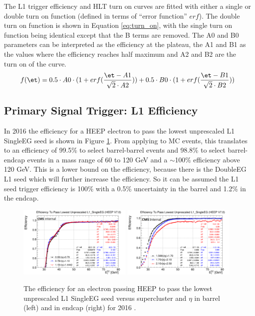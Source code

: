 The L1 trigger efficiency and HLT turn on curves are fitted with either a single or double turn on function (defined in terms of ``error function'' $erf$). The double turn on function is shown in Equation \ref{eq:turn_on}, with the single turn on function being identical except that the B terms are removed. The A0 and B0 parameters can be interpreted as the efficiency at the plateau, the A1 and B1 as the values where the efficiency reaches half maximum and A2 and B2 are the turn on of the curve.
\begin{equation}
f(\et)=0.5\cdot A0\cdot(1+erf(\frac{\et-A1}{\sqrt{2}\cdot A2}))+0.5\cdot B0\cdot(1+erf(\frac{\et-B1}{\sqrt{2}\cdot B2}))
\label{eq:turn_on}
\end{equation}

\subsection{Primary Signal Trigger: L1 Efficiency}\label{sec:L1_trigger_efficiency}
In 2016 the efficiency for a HEEP electron to pass the lowest unprescaled L1 SingleEG seed is shown in Figure \ref{fig:L1_eff_2016}. From applying to MC events, this translates to an efficiency of 99.5\% to select barrel-barrel events and 98.8\% to select barrel-endcap events in a mass range of 60 to 120 GeV and a $\sim$100\% efficiency above 120 GeV. This is a lower bound on the efficiency, because there is the DoubleEG L1 seed which will further increase the efficiency. So it can be assumed the L1 seed trigger efficiency is 100\% with a 0.5\% uncertainty in the barrel and 1.2\% in the endcap.
\begin{figure}[h!]
\begin{center}
\includegraphics[width=0.49\textwidth]{figures/Zprime/2016/trigger/l1SingleEGEffEB.png}
\includegraphics[width=0.49\textwidth]{figures/Zprime/2016/trigger/l1SingleEGEffEE.png}
\caption{The efficiency for an electron passing HEEP to pass the lowest unprescaled L1 SingleEG seed versus supercluster \et and $\eta$ in barrel (left) and in endcap (right) for 2016 \cite{CMS-AN-2016-404}.}
\label{fig:L1_eff_2016}
\end{center}
\end{figure}

